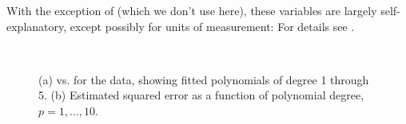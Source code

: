 \documentclass[
]{jss}
\begin{document}
With the exception of  (which we don't use here), these
variables are largely self-explanatory, except possibly for units of
measurement: For details see 
.

\begin{CodeChunk}
\begin{figure}

{\centering {}~~~

}

\caption{(a)  vs.  for the  data, showing fitted polynomials of degree 1 through 5. (b) Estimated squared error as a function of polynomial degree, $p = 1, \ldots, 10$.}\label{fig:mpg-horsepower-polynomials}
\end{figure}
\end{CodeChunk}
\end{document}
